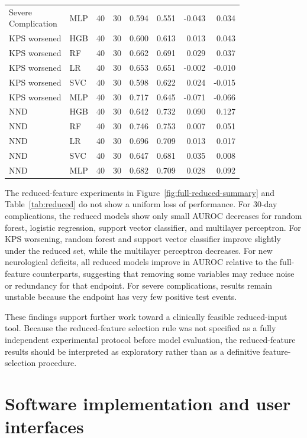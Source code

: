 \documentclass[11pt,a4paper]{article}
\begin{document}
\begin{longtable}{p{2.0cm}p{1.0cm}rrrrrr}
\shortstack[l]{Severe\\Complication} & MLP & 40 & 30 & 0.594 & 0.551 & -0.043 & 0.034 \\
\addlinespace
KPS worsened & HGB & 40 & 30 & 0.600 & 0.613 & 0.013 & 0.043 \\
KPS worsened & RF & 40 & 30 & 0.662 & 0.691 & 0.029 & 0.037 \\
KPS worsened & LR & 40 & 30 & 0.653 & 0.651 & -0.002 & -0.010 \\
KPS worsened & SVC & 40 & 30 & 0.598 & 0.622 & 0.024 & -0.015 \\
KPS worsened & MLP & 40 & 30 & 0.717 & 0.645 & -0.071 & -0.066 \\
\addlinespace
NND & HGB & 40 & 30 & 0.642 & 0.732 & 0.090 & 0.127 \\
NND & RF & 40 & 30 & 0.746 & 0.753 & 0.007 & 0.051 \\
NND & LR & 40 & 30 & 0.696 & 0.709 & 0.013 & 0.017 \\
NND & SVC & 40 & 30 & 0.647 & 0.681 & 0.035 & 0.008 \\
NND & MLP & 40 & 30 & 0.682 & 0.709 & 0.028 & 0.092 \\
\bottomrule
\end{longtable}
\endgroup

The reduced-feature experiments in Figure~\ref{fig:full-reduced-summary} and Table~\ref{tab:reduced} do not show a uniform loss of performance. For 30-day complications, the reduced models show only small AUROC decreases for random forest, logistic regression, support vector classifier, and multilayer perceptron. For KPS worsening, random forest and support vector classifier improve slightly under the reduced set, while the multilayer perceptron decreases. For new neurological deficits, all reduced models improve in AUROC relative to the full-feature counterparts, suggesting that removing some variables may reduce noise or redundancy for that endpoint. For severe complications, results remain unstable because the endpoint has very few positive test events.

These findings support further work toward a clinically feasible reduced-input tool. Because the reduced-feature selection rule was not specified as a fully independent experimental protocol before model evaluation, the reduced-feature results should be interpreted as exploratory rather than as a definitive feature-selection procedure.

\section{Software implementation and user interfaces}
\end{document}
